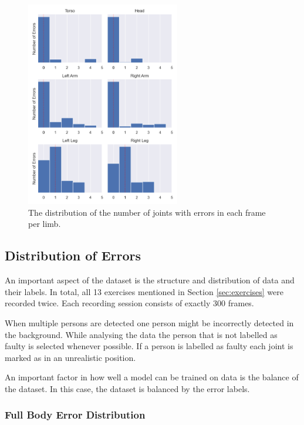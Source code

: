 \begin{figure}
  \centering
  \includegraphics[width=0.6\textwidth]{figures/Data/joint_errors_per_pose/distribution_of_joint_errors_per_pose_per_body_part.png}
  \caption[Number of Joints with error per limb]{The distribution of the number of joints with errors in each frame per limb.}
  \label{fig:dist_lb_epp}
\end{figure}

\subsection{Distribution of Errors}

An important aspect of the dataset is the structure and distribution of data and their labels. In total, all 13 exercises mentioned in Section \ref{sec:exercises} were recorded twice. Each recording session consists of exactly 300 frames.

When multiple persons are detected one person might be incorrectly detected in the background. While analysing the data the person that is not labelled as faulty is selected whenever possible. If a person is labelled as faulty each joint is marked as in an unrealistic position.

An important factor in how well a model can be trained on data is the balance of the dataset. In this case, the dataset is balanced by the error labels. 

\subsubsection{Full Body Error Distribution}

